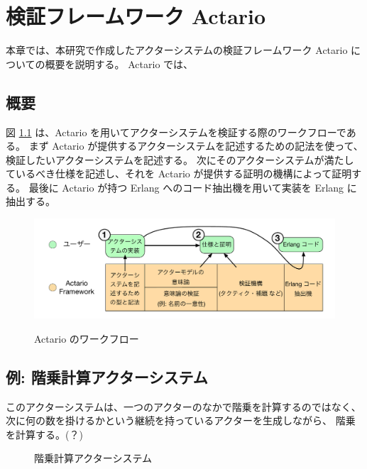 \chapter{検証フレームワーク Actario}
\label{chapter:overview}

本章では、本研究で作成したアクターシステムの検証フレームワーク Actario についての概要を説明する。
Actario では、

\section{概要}

図 \ref{img:overview:workflow} は、Actario を用いてアクターシステムを検証する際のワークフローである。
まず Actario が提供するアクターシステムを記述するための記法を使って、検証したいアクターシステムを記述する。
次にそのアクターシステムが満たしているべき仕様を記述し、それを Actario が提供する証明の機構によって証明する。
最後に Actario が持つ Erlang へのコード抽出機を用いて実装を Erlang に抽出する。

\begin{figure}[tp]
  \includegraphics[width=14cm]{./img/workflow.pdf}
  \label{img:overview:workflow}
  \caption{Actario のワークフロー}
\end{figure}

\section{例: 階乗計算アクターシステム}

このアクターシステムは、一つのアクターのなかで階乗を計算するのではなく、
次に何の数を掛けるかという継続を持っているアクターを生成しながら、
階乗を計算する。(？)

\begin{figure}[tp]
  
  \label{code:overview:fact}
  \caption{階乗計算アクターシステム}
\end{figure}
